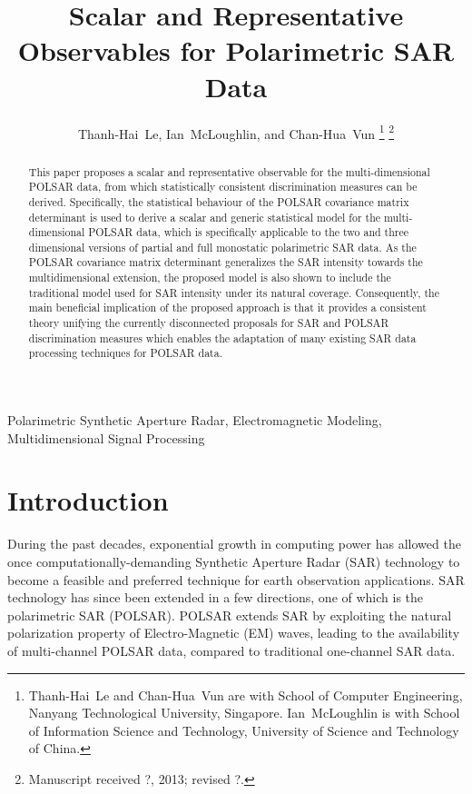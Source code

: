 \documentclass[journal]{IEEEtran}
\title{
  Scalar and Representative Observables for Polarimetric SAR Data
}
\author{Thanh-Hai~Le,
        Ian~McLoughlin, 
	and Chan-Hua~Vun%
\thanks{Thanh-Hai~Le and Chan-Hua~Vun are with School of Computer Engineering, 
Nanyang Technological University, Singapore. Ian~McLoughlin is with School of Information Science and Technology,
University of Science and Technology of China.
}%
\thanks{Manuscript received ?, 2013; revised ?.}}
\begin{document}
\maketitle

\begin{abstract}
This paper proposes a scalar and representative observable for the multi-dimensional POLSAR data,
  from which statistically consistent discrimination measures can be derived.
Specifically, the statistical behaviour of the POLSAR covariance matrix determinant is used
  to derive a scalar and generic statistical model for the multi-dimensional POLSAR data,
  which is specifically applicable to the two and three dimensional versions of partial and full monostatic polarimetric SAR data.
As the POLSAR covariance matrix determinant generalizes the SAR intensity towards the multidimensional extension,
  the proposed model is also shown to include the traditional model used for SAR intensity under its natural coverage.
Consequently, the main beneficial implication of the proposed approach is that
  it provides a consistent theory unifying the currently disconnected proposals for SAR and POLSAR discrimination measures
  which enables the adaptation of many existing SAR data processing techniques for POLSAR data.
\end{abstract}

\begin{IEEEkeywords}
Polarimetric Synthetic Aperture Radar, Electromagnetic Modeling, Multidimensional Signal Processing  
\end{IEEEkeywords}

\IEEEpeerreviewmaketitle

\section{Introduction}

During the past decades, exponential growth in computing power has allowed the once computationally-demanding Synthetic Aperture Radar (SAR)
technology to become a feasible and preferred technique for earth observation applications.
SAR technology has since been extended in a few directions, one of which is the polarimetric SAR (POLSAR).
POLSAR extends SAR by exploiting the natural polarization property of Electro-Magnetic (EM) waves,
  leading to the availability of multi-channel POLSAR data, compared to traditional one-channel SAR data.
  
\end{document}
